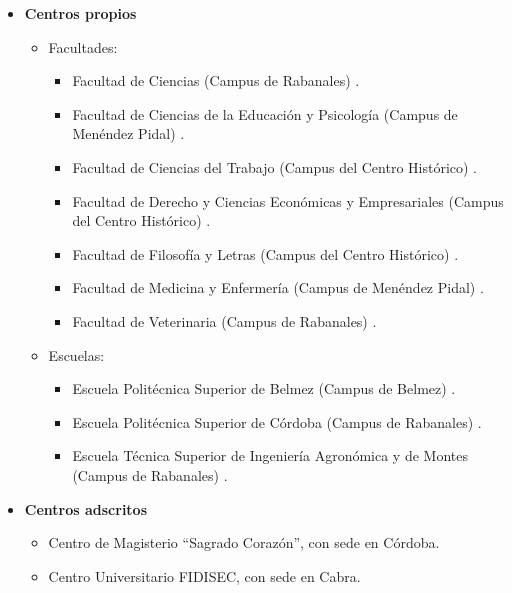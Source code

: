    \begin{itemize}
    \item \textbf{Centros propios}
        \begin{itemize}
        \item Facultades:
            \begin{itemize}
                \item Facultad de Ciencias (Campus de Rabanales) \cite{WebComisionesFacultadCiencias}.
                \item Facultad de Ciencias de la Educación y Psicología (Campus de Menéndez Pidal) \cite{WebComisionesFacultadEducación}.
                \item Facultad de Ciencias del Trabajo (Campus del Centro Histórico) \cite{WebComisionesFacultadTrabajo}.
                \item Facultad de Derecho y Ciencias Económicas y Empresariales (Campus del Centro Histórico) \cite{WebComisionesFacultadEconómicas}.
                \item Facultad de Filosofía y Letras (Campus del Centro Histórico) \cite{WebComisionesFacultadFilosofía}.
                \item Facultad de Medicina y Enfermería  (Campus de Menéndez Pidal) \cite{WebComisionesFacultadMedicina}.
                \item Facultad de Veterinaria (Campus de Rabanales) \cite{WebComisionesFacultadVeterinaria}.
            \end{itemize}
        \item Escuelas:
        \begin{itemize}
            \item Escuela Politécnica Superior de Belmez (Campus de Belmez) \cite{WebComisionesEPSBelmez}.
            \item Escuela Politécnica Superior de Córdoba (Campus de Rabanales) \cite{WebComisionesEPSUco}.
            \item Escuela Técnica Superior de Ingeniería Agronómica y de Montes (Campus de Rabanales) \cite{WebComisionesEPSAgronómica}.
        \end{itemize}
    \end{itemize}
    \item \textbf{Centros adscritos}
    \begin{itemize}
        \item Centro de Magisterio ``Sagrado Corazón'', con sede en Córdoba. \cite{WebComisionesAdscritoMagisterio}
        \item Centro Universitario FIDISEC, con sede en Cabra. \cite{WebComisionesAdscritoFidisecUCO}
    \end{itemize}
\end{itemize}    


